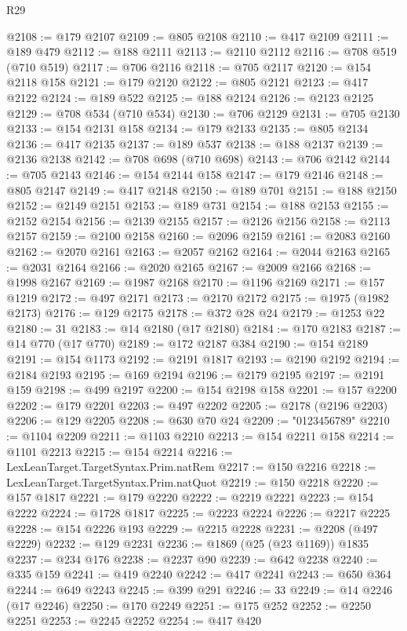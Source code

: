 \begin{lexlean}{R29}
\begin{coremodule}
@2108 := @179 @2107
@2109 := @805 @2108
@2110 := @417 @2109
@2111 := @189 @479
@2112 := @188 @2111
@2113 := @2110 @2112
@2116 := @708 @519 (@710 @519)
@2117 := @706 @2116
@2118 := @705 @2117
@2120 := @154 @2118 @158
@2121 := @179 @2120
@2122 := @805 @2121
@2123 := @417 @2122
@2124 := @189 @522
@2125 := @188 @2124
@2126 := @2123 @2125
@2129 := @708 @534 (@710 @534)
@2130 := @706 @2129
@2131 := @705 @2130
@2133 := @154 @2131 @158
@2134 := @179 @2133
@2135 := @805 @2134
@2136 := @417 @2135
@2137 := @189 @537
@2138 := @188 @2137
@2139 := @2136 @2138
@2142 := @708 @698 (@710 @698)
@2143 := @706 @2142
@2144 := @705 @2143
@2146 := @154 @2144 @158
@2147 := @179 @2146
@2148 := @805 @2147
@2149 := @417 @2148
@2150 := @189 @701
@2151 := @188 @2150
@2152 := @2149 @2151
@2153 := @189 @731
@2154 := @188 @2153
@2155 := @2152 @2154
@2156 := @2139 @2155
@2157 := @2126 @2156
@2158 := @2113 @2157
@2159 := @2100 @2158
@2160 := @2096 @2159
@2161 := @2083 @2160
@2162 := @2070 @2161
@2163 := @2057 @2162
@2164 := @2044 @2163
@2165 := @2031 @2164
@2166 := @2020 @2165
@2167 := @2009 @2166
@2168 := @1998 @2167
@2169 := @1987 @2168
@2170 := @1196 @2169
@2171 := @157 @1219
@2172 := @497 @2171
@2173 := @2170 @2172
@2175 := @1975 (@1982 @2173)
@2176 := @129 @2175
@2178 := @372 @28 @24
@2179 := @1253 @22
@2180 := 31
@2183 := @14 @2180 (@17 @2180)
@2184 := @170 @2183
@2187 := @14 @770 (@17 @770)
@2189 := @172 @2187 @384
@2190 := @154 @2189
@2191 := @154 @1173
@2192 := @2191 @1817
@2193 := @2190 @2192
@2194 := @2184 @2193
@2195 := @169 @2194
@2196 := @2179 @2195
@2197 := @2191 @159
@2198 := @499 @2197
@2200 := @154 @2198 @158
@2201 := @157 @2200
@2202 := @179 @2201
@2203 := @497 @2202
@2205 := @2178 (@2196 @2203)
@2206 := @129 @2205
@2208 := @630 @70 @24
@2209 := "0123456789"
@2210 := @1104 @2209
@2211 := @1103 @2210
@2213 := @154 @2211 @158
@2214 := @1101 @2213
@2215 := @154 @2214
@2216 := LexLeanTarget.TargetSyntax.Prim.natRem
@2217 := @150 @2216
@2218 := LexLeanTarget.TargetSyntax.Prim.natQuot
@2219 := @150 @2218
@2220 := @157 @1817
@2221 := @179 @2220
@2222 := @2219 @2221
@2223 := @154 @2222
@2224 := @1728 @1817
@2225 := @2223 @2224
@2226 := @2217 @2225
@2228 := @154 @2226 @193
@2229 := @2215 @2228
@2231 := @2208 (@497 @2229)
@2232 := @129 @2231
@2236 := @1869 (@25 (@23 @1169)) @1835
@2237 := @234 @176
@2238 := @2237 @90
@2239 := @642 @2238
@2240 := @335 @159
@2241 := @419 @2240
@2242 := @417 @2241
@2243 := @650 @364
@2244 := @649 @2243
@2245 := @399 @291
@2246 := 33
@2249 := @14 @2246 (@17 @2246)
@2250 := @170 @2249
@2251 := @175 @252
@2252 := @2250 @2251
@2253 := @2245 @2252
@2254 := @417 @420

\end{coremodule}
\end{lexlean}
